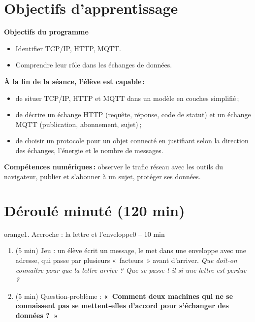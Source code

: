 \documentclass[11pt,a4paper]{article}
\begin{document}
\section{Objectifs d'apprentissage}
\begin{tcolorbox}[colback=gray!8,colframe=gray!60!black,arc=1mm,boxrule=0.5pt]
\textbf{Objectifs du programme}
\begin{itemize}
 \item Identifier TCP/IP, HTTP, MQTT.
 \item Comprendre leur rôle dans les échanges de données.
\end{itemize}
\textbf{À la fin de la séance, l'élève est capable\,:}
\begin{itemize}
 \item de situer TCP/IP, HTTP et MQTT dans un modèle en couches simplifié\,;
 \item de décrire un échange HTTP (requête, réponse, code de statut) et un échange MQTT (publication, abonnement, sujet)\,;
 \item de choisir un protocole pour un objet connecté en justifiant selon la direction des échanges, l'énergie et le nombre de messages.
\end{itemize}
\textbf{Compétences numériques\,:} observer le trafic réseau avec les outils du navigateur, publier et s'abonner à un sujet, protéger ses données.
\end{tcolorbox}

\section{Déroulé minuté (120 min)}

\begin{etape}{orange}{1. Accroche : la lettre et l'enveloppe}{0 -- 10 min}
\begin{enumerate}
 \item (5 min) Jeu : un élève écrit un message, le met dans une enveloppe avec une adresse, qui passe par plusieurs «~facteurs~» avant d'arriver. \emph{Que doit-on connaître pour que la lettre arrive ? Que se passe-t-il si une lettre est perdue ?}
 \item (5 min) Question-problème : \textbf{«~Comment deux machines qui ne se connaissent pas se mettent-elles d'accord pour s'échanger des données ?~»}
\end{enumerate}
\end{etape}
\end{document}
